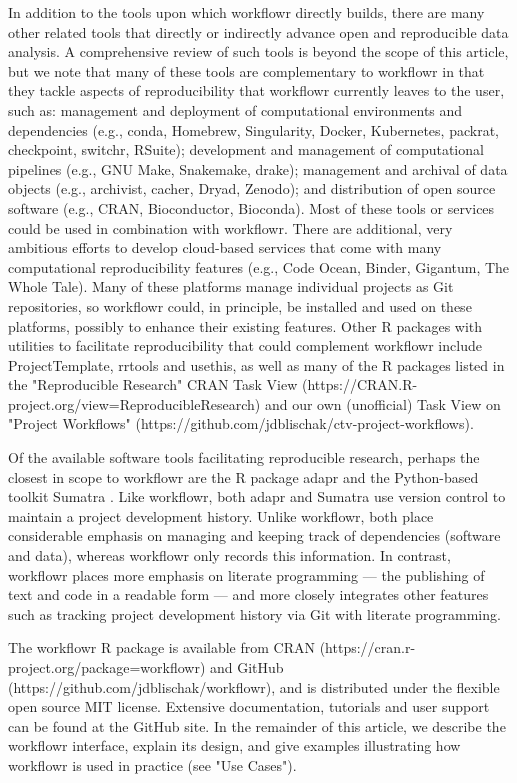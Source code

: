 \documentclass[9pt,a4paper]{extarticle}
\begin{document}
In addition to the tools upon which workflowr directly builds, there are
many other related tools that directly or indirectly advance open and
reproducible data analysis. A comprehensive review of such tools is
beyond the scope of this article, but we note that many of these tools
are complementary to workflowr in that they tackle aspects of
reproducibility that workflowr currently leaves to the user, such as:
management and deployment of computational environments and dependencies
(e.g., conda, Homebrew, Singularity, Docker, Kubernetes, packrat,
checkpoint, switchr, RSuite); development and management of
computational pipelines (e.g., GNU Make, Snakemake, drake); management
and archival of data objects (e.g., archivist, cacher, Dryad, Zenodo);
and distribution of open source software (e.g., CRAN, Bioconductor,
Bioconda). Most of these tools or services could be used in combination
with workflowr. There are additional, very ambitious efforts to develop
cloud-based services that come with many computational reproducibility
features (e.g., Code Ocean, Binder, Gigantum, The Whole Tale). Many of
these platforms manage individual projects as Git repositories, so
workflowr could, in principle, be installed and used on these platforms,
possibly to enhance their existing features. Other R packages with
utilities to facilitate reproducibility that could complement workflowr
include ProjectTemplate, rrtools and usethis, as well as many of the R
packages listed in the "Reproducible Research" CRAN Task View
(https://CRAN.R-project.org/view=ReproducibleResearch) and our own
(unofficial) Task View on "Project Workflows"
(https://github.com/jdblischak/ctv-project-workflows).

Of the available software tools facilitating reproducible research,
perhaps the closest in scope to workflowr are the R package adapr
\cite{Gelfond2018} and the Python-based toolkit Sumatra
\cite{Davidson2014}. Like workflowr, both adapr and Sumatra use version
control to maintain a project development history. Unlike workflowr,
both place considerable emphasis on managing and keeping track of
dependencies (software and data), whereas workflowr only records this
information. In contrast, workflowr places more emphasis on literate
programming --- the publishing of text and code in a readable form ---
and more closely integrates other features such as tracking project
development history via Git with literate programming.

The workflowr R package is available from CRAN
(https://cran.r-project.org/package=workflowr) and GitHub
(https://github.com/jdblischak/workflowr), and is distributed under the
flexible open source MIT license. Extensive documentation, tutorials and
user support can be found at the GitHub site. In the remainder of this
article, we describe the workflowr interface, explain its design, and
give examples illustrating how workflowr is used in practice (see "Use
Cases").
\end{document}

